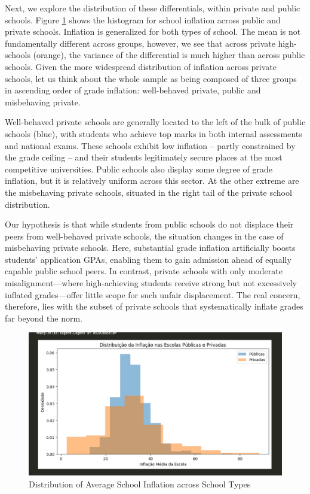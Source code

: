 \documentclass{article}
\begin{document}
Next, we explore the distribution of these differentials, within private and public schools. Figure \ref{fig:DistributionInflationPublicPrivate} shows the histogram for school inflation across public and private schools. Inflation is  generalized for both types of school. The mean is not fundamentally different across groups, however, we see that across private high-schools (orange), the variance of the differential is much higher than across public schools. Given the more widespread distribution of inflation across private schools, let us think about the whole sample as being composed of three groups in ascending order of grade inflation: well-behaved private, public and misbehaving private. 

Well-behaved private schools are generally located to the left of the bulk of public schools (blue), with students who achieve top marks in both internal assessments and national exams. These schools exhibit low inflation -- partly constrained by the grade ceiling -- and their students legitimately secure places at the most competitive universities. Public schools also display some degree of grade inflation, but it is relatively uniform across this sector. At the other extreme are the misbehaving private schools, situated in the right tail of the private school distribution.

Our hypothesis is that while students from public schools do not displace their peers from well-behaved private schools, the situation changes in the case of misbehaving private schools. Here, substantial grade inflation artificially boosts students’ application GPAs, enabling them to gain admission ahead of equally capable public school peers. In contrast, private schools with only moderate misalignment—where high-achieving students receive strong but not excessively inflated grades—offer little scope for such unfair displacement. The real concern, therefore, lies with the subset of private schools that systematically inflate grades far beyond the norm.

\begin{figure}
    \centering
    \includegraphics[width=0.75\linewidth]{Figures/DistributionInflationPublicPrivate.jpeg}
    \caption{Distribution of Average School Inflation across School Types}
    \label{fig:DistributionInflationPublicPrivate}
\end{figure}
\end{document}
